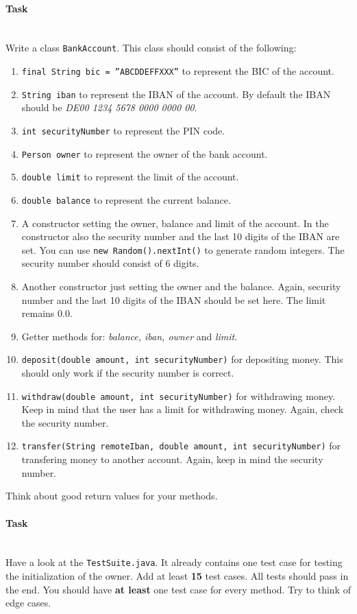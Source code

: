 \documentclass[10pt, a4paper]{article}
\newcounter{task}
\newcommand{\task}{\stepcounter{task}\paragraph{Task \thetask}\ \\}
\theoremstyle{definition}
\theoremstyle{remark}
\begin{document}
\task
Write a class \texttt{BankAccount}. This class should consist of the following:
\begin{enumerate}
	\item \texttt{final String bic = ''ABCDDEFFXXX''} to represent the BIC of the account.
	\item \texttt{String iban} to represent the IBAN of the account. By default the IBAN should be \textit{DE00 1234 5678 0000 0000 00}.
	\item \texttt{int securityNumber} to represent the PIN code.
	\item \texttt{Person owner} to represent the owner of the bank account.
	\item \texttt{double limit} to represent the limit of the account.
	\item \texttt{double balance} to represent the current balance.
	\item A constructor setting the owner, balance and limit of the account. In the constructor also the security number and the last 10 digits of the IBAN are set. You can use \texttt{new Random().nextInt()} to generate random integers. The security number should consist of 6 digits.
	\item Another constructor just setting the owner and the balance. Again, security number and the last 10 digits of the IBAN should be set here. The limit remains 0.0.
	\item Getter methods for: \textit{balance, iban, owner} and \textit{limit}.
	\item \texttt{deposit(double amount, int securityNumber)} for depositing money. This should only work if the security number is correct.
	\item \texttt{withdraw(double amount, int securityNumber)} for withdrawing money. Keep in mind that the user has a limit for withdrawing money. Again, check the security number.
	\item \texttt{transfer(String remoteIban, double amount, int securityNumber)} for transfering money to another account. Again, keep in mind the security number.
\end{enumerate}
Think about good return values for your methods.

\task
Have a look at the \texttt{TestSuite.java}. It already contains one test case for testing the initialization of the owner. Add at least \textbf{15} test cases. All tests should pass in the end. You should have \textbf{at least} one test case for every method. Try to think of edge cases.




\end{document}
